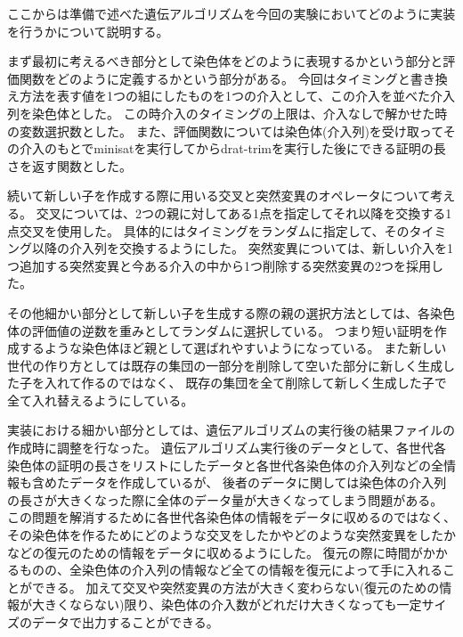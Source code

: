 ここからは準備で述べた遺伝アルゴリズムを今回の実験においてどのように実装を行うかについて説明する。

まず最初に考えるべき部分として染色体をどのように表現するかという部分と評価関数をどのように定義するかという部分がある。
今回はタイミングと書き換え方法を表す値を1つの組にしたものを1つの介入として、この介入を並べた介入列を染色体とした。
この時介入のタイミングの上限は、介入なしで解かせた時の変数選択数とした。
また、評価関数については染色体(介入列)を受け取ってその介入のもとでminisatを実行してからdrat-trimを実行した後にできる証明の長さを返す関数とした。

続いて新しい子を作成する際に用いる交叉と突然変異のオペレータについて考える。
交叉については、2つの親に対してある1点を指定してそれ以降を交換する1点交叉を使用した。
具体的にはタイミングをランダムに指定して、そのタイミング以降の介入列を交換するようにした。
突然変異については、新しい介入を1つ追加する突然変異と今ある介入の中から1つ削除する突然変異の2つを採用した。

その他細かい部分として新しい子を生成する際の親の選択方法としては、各染色体の評価値の逆数を重みとしてランダムに選択している。
つまり短い証明を作成するような染色体ほど親として選ばれやすいようになっている。
また新しい世代の作り方としては既存の集団の一部分を削除して空いた部分に新しく生成した子を入れて作るのではなく、
既存の集団を全て削除して新しく生成した子で全て入れ替えるようにしている。

実装における細かい部分としては、遺伝アルゴリズムの実行後の結果ファイルの作成時に調整を行なった。
遺伝アルゴリズム実行後のデータとして、各世代各染色体の証明の長さをリストにしたデータと各世代各染色体の介入列などの全情報も含めたデータを作成しているが、
後者のデータに関しては染色体の介入列の長さが大きくなった際に全体のデータ量が大きくなってしまう問題がある。
この問題を解消するために各世代各染色体の情報をデータに収めるのではなく、その染色体を作るためにどのような交叉をしたかやどのような突然変異をしたかなどの復元のための情報をデータに収めるようにした。
復元の際に時間がかかるものの、全染色体の介入列の情報など全ての情報を復元によって手に入れることができる。
加えて交叉や突然変異の方法が大きく変わらない(復元のための情報が大きくならない)限り、染色体の介入数がどれだけ大きくなっても一定サイズのデータで出力することができる。